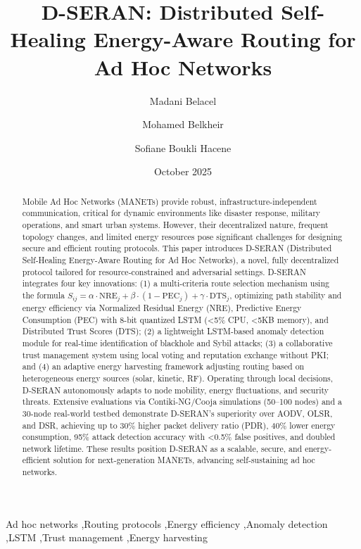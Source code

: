 \documentclass[preprint]{elsarticle}
\title{D-SERAN: Distributed Self-Healing Energy-Aware Routing for Ad Hoc Networks}
\author[1]{Madani Belacel}
\author[2]{Mohamed Belkheir}
\author[1]{Sofiane Boukli Hacene}
\date{October 2025}
\begin{document}
\begin{frontmatter}
\maketitle

\begin{abstract}
Mobile Ad Hoc Networks (MANETs) provide robust, infrastructure-independent communication, critical for dynamic environments like disaster response, military operations, and smart urban systems. However, their decentralized nature, frequent topology changes, and limited energy resources pose significant challenges for designing secure and efficient routing protocols. This paper introduces D-SERAN (Distributed Self-Healing Energy-Aware Routing for Ad Hoc Networks), a novel, fully decentralized protocol tailored for resource-constrained and adversarial settings. D-SERAN integrates four key innovations: (1) a multi-criteria route selection mechanism using the formula \( S_{ij} = \alpha \cdot \text{NRE}_j + \beta \cdot (1 - \text{PEC}_j) + \gamma \cdot \text{DTS}_j \), optimizing path stability and energy efficiency via Normalized Residual Energy (NRE), Predictive Energy Consumption (PEC) with 8-bit quantized LSTM (<5\% CPU, <5KB memory), and Distributed Trust Scores (DTS); (2) a lightweight LSTM-based anomaly detection module for real-time identification of blackhole and Sybil attacks; (3) a collaborative trust management system using local voting and reputation exchange without PKI; and (4) an adaptive energy harvesting framework adjusting routing based on heterogeneous energy sources (solar, kinetic, RF). Operating through local decisions, D-SERAN autonomously adapts to node mobility, energy fluctuations, and security threats. Extensive evaluations via Contiki-NG/Cooja simulations (50–100 nodes) and a 30-node real-world testbed demonstrate D-SERAN’s superiority over AODV, OLSR, and DSR, achieving up to 30\% higher packet delivery ratio (PDR), 40\% lower energy consumption, 95\% attack detection accuracy with <0.5\% false positives, and doubled network lifetime. These results position D-SERAN as a scalable, secure, and energy-efficient solution for next-generation MANETs, advancing self-sustaining ad hoc networks.
\end{abstract}

\begin{keyword}
Ad hoc networks \sep Routing protocols \sep Energy efficiency \sep Anomaly detection \sep LSTM \sep Trust management \sep Energy harvesting
\end{keyword}

\end{frontmatter}
\end{document}
